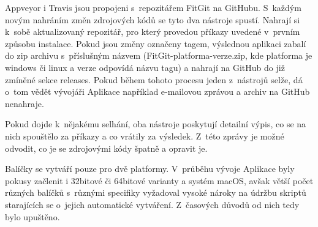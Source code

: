 Appveyor i Travis jsou propojeni s~repozitářem FitGit na GitHubu. S~každým novým nahráním změn zdrojových kódů se tyto dva nástroje spustí. Nahrají si k~sobě aktualizovaný repozitář, pro který provedou příkazy uvedené v~prvním způsobu instalace. Pokud jsou změny označeny tagem, výslednou aplikaci zabalí do zip archivu s~příslušným názvem (Fit\-Git-plat\-for\-ma-ver\-ze.zip, kde platforma je windows či linux a verze odpovídá názvu tagu) a nahrají na GitHub do již zmíněné sekce releases. Pokud během tohoto procesu jeden z~nástrojů selže, dá o~tom vědět vývojáři Aplikace například e-mailovou zprávou a archiv na GitHub nenahraje.

Pokud dojde k~nějakému selhání, oba nástroje poskytují detailní výpis, co se na nich spouštělo za příkazy a co vrátily za výsledek. Z~této zprávy je možné odvodit, co je se zdrojovými kódy špatně a opravit je.

Balíčky se vytváří pouze pro dvě platformy. V~průběhu vývoje Aplikace byly pokusy začlenit i 32bitové či 64bitové varianty a systém macOS, avšak větší počet různých balíčků s~různými specifiky vyžadoval vysoké nároky na údržbu skriptů starajících se o~jejich automatické vytváření. Z~časových důvodů od nich tedy bylo upuštěno.
